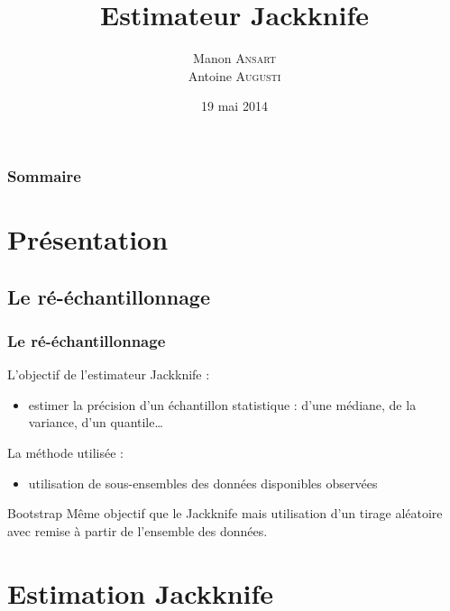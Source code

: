 \documentclass[handout]{beamer}
\title{
	Estimateur Jackknife
}
\author{
	Manon \textsc{Ansart} \\
	\vspace{10px}
	Antoine \textsc{Augusti}
}
\date{19 mai 2014}
\begin{document}
	\begin{frame}[plain]
		\titlepage
	\end{frame}

	\begin{frame}[plain]
		\frametitle{Sommaire}
		\tableofcontents
	\end{frame}


	\section{Présentation}


		\subsection{Le ré-échantillonnage}
		\begin{frame}
			\frametitle{Le ré-échantillonnage}

			L'objectif de l'estimateur Jackknife :
			\begin{itemize}
				\item estimer la précision d'un échantillon statistique : d'une médiane, de la variance, d'un quantile\dots
			\end{itemize}

			\vspace{15px}

			La méthode utilisée :
			\begin{itemize}
				\item utilisation de sous-ensembles des données disponibles observées
			\end{itemize}

			\vspace{20px}

			\begin{exampleblock}{Bootstrap}
				Même objectif que le Jackknife mais utilisation d'un tirage aléatoire avec remise à partir de l'ensemble des données.
			\end{exampleblock}
		\end{frame}

	\section{Estimation Jackknife}
\end{document}
